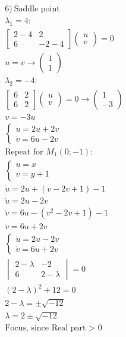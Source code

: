 \documentclass{article}
\begin{document}
\addtolength{\jot}{1pt}
\begin{fleqn}[1\parindent]
  \begin{gather*}
    6)\ \text{Saddle point} \\
    \lambda_1 = 4: \\ 
    \begin{bmatrix}
      2-4 & 2 \\ 
      6 & -2-4
    \end{bmatrix}\begin{pmatrix}
      u \\ v
    \end{pmatrix} = 0 \\ 
    u = v \rightarrow \begin{pmatrix}
      1 \\ 1
    \end{pmatrix} \\ 
    \lambda_2 = -4: \\
    \begin{bmatrix}
      6 & 2 \\ 
      6 & 2
    \end{bmatrix}
    \begin{pmatrix}
      u \\ v
    \end{pmatrix} 
    = 0 \rightarrow \begin{pmatrix}
      1 \\ -3
    \end{pmatrix} \\ 
    v = -3u \\ 
    \begin{cases}
      \dot{u}=2u+2v \\ 
      \dot{v}=6u-2v
    \end{cases} \\
    \text{Repeat for } M_1(0;-1): \\ 
    \begin{cases}
      u=x \\ 
      v=y+1
    \end{cases} \\
    \dot{u}=2u+(v-2v+1)-1 \\ 
    \dot{u}=2u-2v \\ 
    \dot{v}=6u-(v^2-2v+1)-1 \\ 
    \dot{v}=6u+2v \\ 
    \begin{cases}
      \dot{u}=2u-2v \\ 
      \dot{v}=6u+2v
    \end{cases} \\ 
    \begin{vmatrix}
      2-\lambda & -2 \\ 
      6 & 2-\lambda
    \end{vmatrix} = 0 \\ 
    (2-\lambda)^2+12=0 \\ 
    2-\lambda = \pm\sqrt{-12} \\ 
    \lambda = 2 \pm \sqrt{-12} \\
    \text {Focus, since Real part $>$ 0} \\ 
  \end{gather*}
\end{fleqn}
\end{document}

